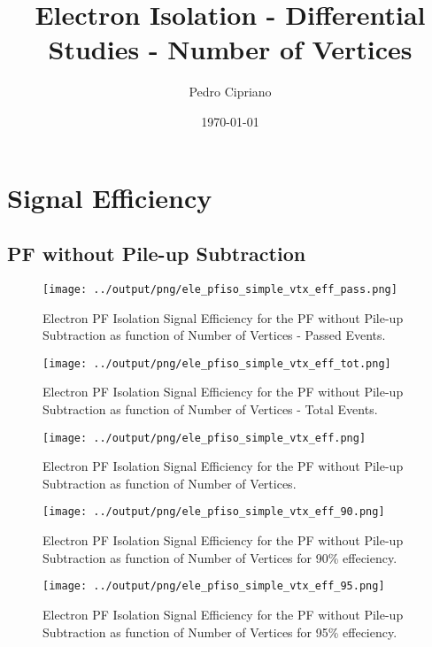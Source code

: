 \documentclass[11pt]{book}
\begin{document}
         
 
 \author{Pedro Cipriano}
 \date{\today}
 \title{Electron Isolation - Differential Studies - Number of Vertices}

\maketitle

\tableofcontents

\chapter{Signal Efficiency}
\section{PF without Pile-up Subtraction}
\begin{figure}[htb]
\centering
\texttt{[image: ../output/png/ele\_pfiso\_simple\_vtx\_eff\_pass.png]}
\caption{Electron PF Isolation Signal Efficiency for the PF without Pile-up Subtraction as function of Number of Vertices - Passed Events.}
\label{fig:ele_pfiso_vtx_eff_simple_pass}
\end{figure}


\begin{figure}[htb]
\centering
\texttt{[image: ../output/png/ele\_pfiso\_simple\_vtx\_eff\_tot.png]}
\caption{Electron PF Isolation Signal Efficiency for the PF without Pile-up Subtraction as function of Number of Vertices - Total Events.}
\label{fig:ele_pfiso_vtx_eff_simple_tot}
\end{figure}

\begin{figure}[htb]
\centering
\texttt{[image: ../output/png/ele\_pfiso\_simple\_vtx\_eff.png]}
\caption{Electron PF Isolation Signal Efficiency for the PF without Pile-up Subtraction as function of Number of Vertices.}
\label{fig:ele_pfiso_vtx_eff_simple}
\end{figure}

\begin{figure}[htb]
\centering
\texttt{[image: ../output/png/ele\_pfiso\_simple\_vtx\_eff\_90.png]}
\caption{Electron PF Isolation Signal Efficiency for the PF without Pile-up Subtraction as function of Number of Vertices for 90\% effeciency.}
\label{fig:ele_pfiso_vtx_eff_simple_eff_90}
\end{figure}

\begin{figure}[htb]
\centering
\texttt{[image: ../output/png/ele\_pfiso\_simple\_vtx\_eff\_95.png]}
\caption{Electron PF Isolation Signal Efficiency for the PF without Pile-up Subtraction as function of Number of Vertices for 95\% effeciency.}
\label{fig:ele_pfiso_vtx_eff_simple_eff_95}
\end{figure}
\end{document}
